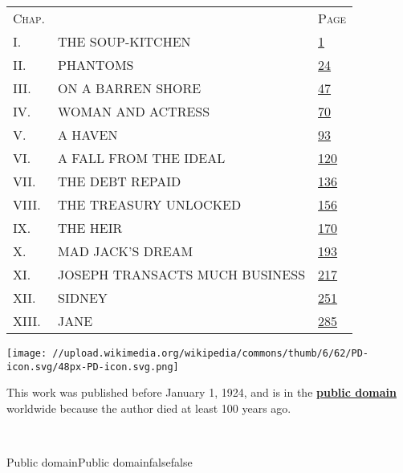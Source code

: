 \begin{longtable}[]{@{}lll@{}}
\toprule
\textsc{Chap.} & & \textsc{Page}\tabularnewline
I. & THE SOUP-KITCHEN &
\href{/wiki/The_Nether_World/Volume_3/Chapter_1\#1}{1}\tabularnewline
II. & PHANTOMS &
\href{/wiki/The_Nether_World/Volume_3/Chapter_2\#24}{24}\tabularnewline
III. & ON A BARREN SHORE &
\href{/wiki/The_Nether_World/Volume_3/Chapter_3\#47}{47}\tabularnewline
IV. & WOMAN AND ACTRESS &
\href{/wiki/The_Nether_World/Volume_3/Chapter_4\#70}{70}\tabularnewline
V. & A HAVEN &
\href{/wiki/The_Nether_World/Volume_3/Chapter_5\#93}{93}\tabularnewline
VI. & A FALL FROM THE IDEAL &
\href{/wiki/The_Nether_World/Volume_3/Chapter_6\#120}{120}\tabularnewline
VII. & THE DEBT REPAID &
\href{/wiki/The_Nether_World/Volume_3/Chapter_7\#136}{136}\tabularnewline
VIII. & THE TREASURY UNLOCKED &
\href{/wiki/The_Nether_World/Volume_3/Chapter_8\#156}{156}\tabularnewline
IX. & THE HEIR &
\href{/wiki/The_Nether_World/Volume_3/Chapter_9\#170}{170}\tabularnewline
X. & MAD JACK'S DREAM &
\href{/wiki/The_Nether_World/Volume_3/Chapter_10\#193}{193}\tabularnewline
XI. & JOSEPH TRANSACTS MUCH BUSINESS &
\href{/wiki/The_Nether_World/Volume_3/Chapter_11\#217}{217}\tabularnewline
XII. & SIDNEY &
\href{/wiki/The_Nether_World/Volume_3/Chapter_12\#251}{251}\tabularnewline
XIII. & JANE &
\href{/wiki/The_Nether_World/Volume_3/Chapter_13\#285}{285}\tabularnewline
\bottomrule
\end{longtable}

\protect\hypertarget{imageLeft}{}{\texttt{[image: //upload.wikimedia.org/wikipedia/commons/thumb/6/62/PD-icon.svg/48px-PD-icon.svg.png]}}

\hypertarget{licFrame-centertext}{}
This work was published before January 1, 1924, and is in the
\textbf{\href{https://en.wikipedia.org/wiki/Public_domain}{public
domain}} worldwide because the author died at least 100 years ago.

\protect\hypertarget{noimageRight}{}{~}

{Public domain}{Public domain}{false}{false}
